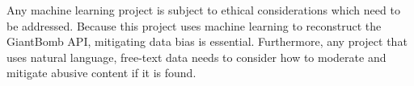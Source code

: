 \documentclass[10pt,twocolumn]{article}
\begin{document}
\begin{comment}
    Data bias. Like any machine learning project, the model is only as good (or as biased) as the data which is put in. The model receives data from Metacritic, GameSpot, and GiantBomb APIs. This means that it receives text data from verified reviewers who have write access to those websites, but it will not get the perspective of the average video game player. In terms of perspectives represented, then, the model overrepresents the critical perspective and ignores the average players' thoughts.

While some abusive content in annotated
datasets is openly hostile or inappropriate, ”edge cases”
such as ironic statements, slander/misinformation, and in-
tention of the speaker can change the classification.

    HOW TO ADDRESS: collect reviews from as many sources as possible, not just 1 individual API. Future work if more time was involved could include scraping review content from average players (from forums, Google reviews, etc.)

    Potential for abusive content. Any NLP application which uses natural language possibly has to contend with abusive content, which includes (but is not limited to) hate speech, casual racism/sexism/other discrimination, etc. Care has to be taken to make sure that this sort of speech is not learned and casually amplified by the model.

    HOW TO ADDRESS: not as relevant in this NLP app because strictly deck/description are used (not reviews). If reviews are used, there are ways to check for hate speech 

    n example of such error checking is to
ensure that the language provided by the user is not active
hate speech. Mathew et al. provide a benchmark dataset of
hate speech, tagging classification, community involved and
rationale of speaker. [5] Performing a search to ensure that
any provided input string is not found within the hate speech
dataset is one possible way to error check before the string
is forwarded to the algorithm. 

\end{comment}

Any machine learning project is subject to ethical considerations which need to be addressed. Because this project uses machine learning to reconstruct the GiantBomb API, mitigating data bias is essential. Furthermore, any project that uses natural language, free-text data needs to consider how to moderate and mitigate abusive content if it is found.
\end{document}
